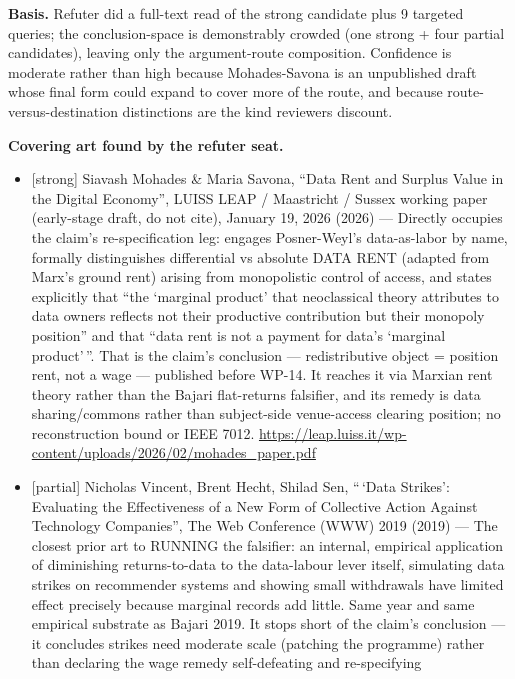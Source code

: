\documentclass[
  11pt,
]{article}
\providecommand{\tightlist}{%
  \setlength{\itemsep}{0pt}\setlength{\parskip}{0pt}}
\begin{document}
\textbf{Basis.} Refuter did a full-text read of the strong candidate
plus 9 targeted queries; the conclusion-space is demonstrably crowded
(one strong + four partial candidates), leaving only the argument-route
composition. Confidence is moderate rather than high because
Mohades-Savona is an unpublished draft whose final form could expand to
cover more of the route, and because route-versus-destination
distinctions are the kind reviewers discount.

\textbf{Covering art found by the refuter seat.}

\begin{itemize}
\tightlist
\item
  {[}strong{]} Siavash Mohades \& Maria Savona, ``Data Rent and Surplus
  Value in the Digital Economy'', LUISS LEAP / Maastricht / Sussex
  working paper (early-stage draft, do not cite), January 19, 2026
  (2026) --- Directly occupies the claim's re-specification leg: engages
  Posner-Weyl's data-as-labor by name, formally distinguishes
  differential vs absolute DATA RENT (adapted from Marx's ground rent)
  arising from monopolistic control of access, and states explicitly
  that ``the `marginal product' that neoclassical theory attributes to
  data owners reflects not their productive contribution but their
  monopoly position'' and that ``data rent is not a payment for data's
  `marginal product'\,''. That is the claim's conclusion ---
  redistributive object = position rent, not a wage --- published before
  WP-14. It reaches it via Marxian rent theory rather than the Bajari
  flat-returns falsifier, and its remedy is data sharing/commons rather
  than subject-side venue-access clearing position; no reconstruction
  bound or IEEE 7012.
  \url{https://leap.luiss.it/wp-content/uploads/2026/02/mohades_paper.pdf}
\item
  {[}partial{]} Nicholas Vincent, Brent Hecht, Shilad Sen, ``\,`Data
  Strikes': Evaluating the Effectiveness of a New Form of Collective
  Action Against Technology Companies'', The Web Conference (WWW) 2019
  (2019) --- The closest prior art to RUNNING the falsifier: an
  internal, empirical application of diminishing returns-to-data to the
  data-labour lever itself, simulating data strikes on recommender
  systems and showing small withdrawals have limited effect precisely
  because marginal records add little. Same year and same empirical
  substrate as Bajari 2019. It stops short of the claim's conclusion ---
  it concludes strikes need moderate scale (patching the programme)
  rather than declaring the wage remedy self-defeating and re-specifying

\end{itemize}
\end{document}
